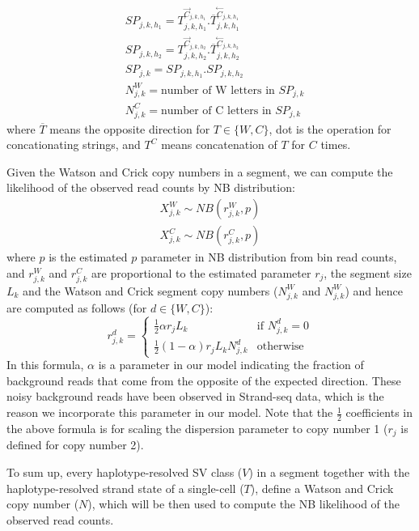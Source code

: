 \documentclass[12pt]{article}
\renewcommand{\j}{j} %
\newcommand{\CN}{C} %
\newcommand{\X}{X} %
\renewcommand{\k}{k} %
\newcommand{\h}{h} %
\newcommand{\T}{T} %
\newcommand{\V}{V} %
\newcommand{\N}{N} %
\begin{document}
\begin{align}\label{strand-pattern}
	&SP_{\j,\k,\h_1} = {\T^{\stackrel{\rightarrow}\CN_{\j,\k,\h_1}}_{\j, \k, \h_1}}.
				  {\overline{\T}^{\stackrel{\leftarrow}\CN_{\j,\k,\h_1}}_{\j, \k,\h_1}}\\
	&SP_{\j,\k,\h_2} = \T^{\stackrel{\rightarrow}\CN_{\j,\k,\h_2}}_{\j, \k, \h_2}.
				  {\overline{\T}^{\stackrel{\leftarrow}\CN_{\j,\k,\h_2}}_{\j, \k,\h_2}}\nonumber\\
	&SP_{\j,\k} = SP_{\j, \k, \h_1}.SP_{\j, \k, \h_2}\nonumber\\
	&\N_{\j, \k}^W = \text{number of W letters in } SP_{\j,\k}\nonumber\\
	&\N_{\j, \k}^C = \text{number of C letters in } SP_{\j,\k}\nonumber
\end{align}
where $\overline{\T}$ means the opposite direction for $\T \in \{W, C\}$, dot is the operation for concationating strings, and $\T^C$ means concatenation of $\T$ for $C$ times.

Given the Watson and Crick copy numbers in a segment, we can compute the likelihood of the observed read counts by NB distribution:
\begin{align}
	\X_{\j,\k}^W \sim NB(r_{\j,\k}^W, p)\nonumber\\
	\X_{\j,\k}^C \sim NB(r_{\j,\k}^C, p)\nonumber
\end{align}
where $p$ is the estimated $p$ parameter in NB distribution from bin read counts, and $r_{\j,\k}^W$ and $r_{\j,\k}^C$ are proportional to the estimated parameter $r_\j$, the segment size $L_\k$ and the Watson and Crick segment copy numbers ($\N_{\j, \k}^W$ and $\N_{\j, \k}^W$) and hence are computed as follows (for $d \in \{W,C\}$):
\[
r_{\j,\k}^d = 
\begin{cases}
\frac{1}{2}\alpha r_\j L_\k &\text{if } \N_{\j, \k}^d = 0 \\ 
\frac{1}{2}(1- \alpha) r_\j L_\k \N_{\j, \k}^d &\text{otherwise}
\end{cases}
\]
In this formula, $\alpha$ is a parameter in our model indicating the fraction of background reads that come from the opposite of the expected direction. These noisy background reads have been observed in Strand-seq data, which is the reason we incorporate this parameter in our model. Note that the $\frac{1}{2}$ coefficients in the above formula is for scaling the dispersion parameter to copy number 1 ($r_\j$ is defined for copy number 2).

To sum up, every haplotype-resolved SV class ($\V$) in a segment together with the haplotype-resolved strand state of a single-cell ($\T$), define a Watson and Crick copy number ($\N$), which will be then used to compute the NB likelihood of the observed read counts.
\end{document}
